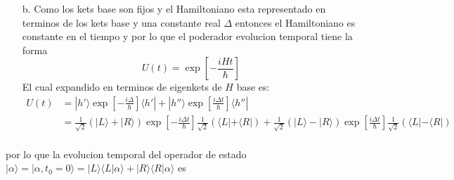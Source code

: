\documentclass[a4paper]{article}
\begin{document}
\begin{answer}
\begin{itemize}
        \item[b.] Como los kets base son fijos y el Hamiltoniano esta representado en terminos de los kets base y una constante real $\Delta$
        entonces el Hamiltoniano es constante en el tiempo y por lo que el poderador evolucion temporal tiene la forma
        $$U(t) = \exp{\left[-\frac{iHt}{\hbar}\right]}$$  
        El cual expandido en terminos de eigenkets de $H$ base es:
        \begin{align*}
            U(t) &= |h'\rangle \exp{\left[-\frac{i\Delta}{\hbar}\right]} \langle h'| + |h''\rangle \exp{\left[\frac{i\Delta t}{\hbar}\right]} \langle h''|\\
            &= \frac{1}{\sqrt{2}}(|L \rangle + |R\rangle) \exp{\left[-\frac{i\Delta t}{\hbar}\right]} \frac{1}{\sqrt{2}}(\langle L| + \langle R|)+ \frac{1}{\sqrt{2}}(|L \rangle - |R\rangle) \exp{\left[\frac{i\Delta t}{\hbar}\right]} \frac{1}{\sqrt{2}}(\langle L| - \langle R|)\\
        \end{align*} 
    \end{itemize}
    por lo que la evolucion temporal del operador de estado $|\alpha \rangle = |\alpha,t_0=0\rangle = |L\rangle \langle L|\alpha\rangle + |R\rangle \langle R|\alpha\rangle$ es 


\end{answer}
\end{document}
